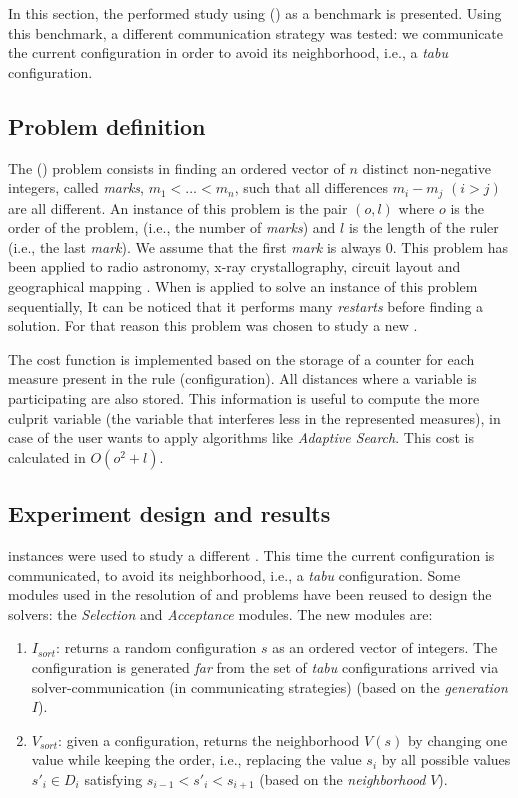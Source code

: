 In this section, the performed study using \grp{} (\GRP) as a benchmark is presented. Using this benchmark, a different communication strategy was tested: we communicate the current configuration in order to avoid its neighborhood, i.e., a {\it tabu} configuration.

\subsection{Problem definition}

The \grp{} (\GRP) problem consists in finding an ordered vector of $n$ distinct non-negative integers, called \textit{marks}, $m_1 < \dots < m_n$, such that all differences $m_i - m_j$ $(i > j)$ are all different. An instance of this problem is the pair $(o,l)$ where $o$ is the order of the problem, (i.e., the number of \textit{marks}) and $l$ is the length of the ruler (i.e., the last {\it mark}). We assume that the first \textit{mark} is always 0. This problem has been applied to radio astronomy, x-ray crystallography, circuit layout and geographical mapping \cite{Soliday1995}. 
When \posl{} is applied to solve an instance of this problem sequentially, It can be noticed that it performs many {\it restarts} before finding a solution. For that reason this problem was chosen to study a new \commstr.

The cost function is implemented based on the storage of a counter for each measure present in the rule (configuration). All distances where a variable is participating are also stored. This information is useful to compute the more culprit variable (the variable that interferes less in the represented measures), in case of the user wants to apply algorithms like {\it Adaptive Search}. This cost is calculated in $O\left(o^2 + l\right)$.

\subsection{Experiment design and results}

\grp{} instances were used to study a different \commstr. This time the current configuration is communicated, to avoid its neighborhood, i.e., a {\it tabu} configuration. Some modules used in the resolution of \sg{} and \carr{} problems have been reused to design the solvers: the \textit{Selection} and \textit{Acceptance} modules. The new modules are:

\begin{enumerate}
	\item$I_{sort}$: returns a random configuration $s$ as an ordered vector of integers. The configuration is generated \textit{far} from the set of {\it tabu} configurations arrived via solver-communication (in communicating strategies) (based on the \textit{generation} \absm{} $I$).
	\item $V_{sort}$: given a configuration, returns the neighborhood $V\left(s\right)$ by changing one value while keeping the order, i.e., replacing the value $s_i$ by all possible values $s'_i \in D_i$ satisfying $s_{i-1} < s'_i < s_{i+1}$ (based on the \textit{neighborhood} \absm{} $V$).
\end{enumerate}

